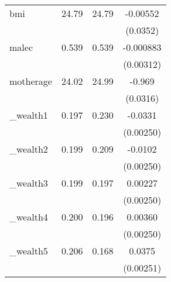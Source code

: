 \begin{table}[htbp]
\begin{tabular}{l*{1}{ccc}}
bmi         &       24.79&       24.79&    -0.00552         \\
            &            &            &    (0.0352)         \\
malec       &       0.539&       0.539&   -0.000883         \\
            &            &            &   (0.00312)         \\
motherage   &       24.02&       24.99&      -0.969\sym{***}\\
            &            &            &    (0.0316)         \\
\_wealth1    &       0.197&       0.230&     -0.0331\sym{***}\\
            &            &            &   (0.00250)         \\
\_wealth2    &       0.199&       0.209&     -0.0102\sym{***}\\
            &            &            &   (0.00250)         \\
\_wealth3    &       0.199&       0.197&     0.00227         \\
            &            &            &   (0.00250)         \\
\_wealth4    &       0.200&       0.196&     0.00360         \\
            &            &            &   (0.00250)         \\
\_wealth5    &       0.206&       0.168&      0.0375\sym{***}\\
            &            &            &   (0.00251)         \\
\bottomrule
\end{tabular}
\end{table}
